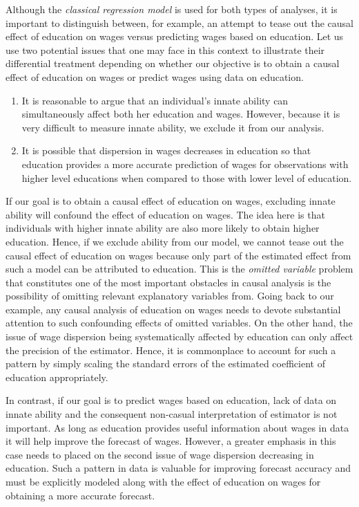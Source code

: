\documentclass[
]{book}
\theoremstyle{definition}
\theoremstyle{definition}
\theoremstyle{definition}
\theoremstyle{definition}
\theoremstyle{remark}
\begin{document}
Although the \emph{classical regression model} is used for both types of analyses, it is important to distinguish between, for example, an attempt to tease out the causal effect of education on wages versus predicting wages based on education. Let us use two potential issues that one may face in this context to illustrate their differential treatment depending on whether our objective is to obtain a causal effect of education on wages or predict wages using data on education.

\begin{enumerate}
\def\labelenumi{\alph{enumi}.}
\item
  It is reasonable to argue that an individual's innate ability can simultaneously affect both her education and wages. However, because it is very difficult to measure innate ability, we exclude it from our analysis.
\item
  It is possible that dispersion in wages decreases in education so that education provides a more accurate prediction of wages for observations with higher level educations when compared to those with lower level of education.
\end{enumerate}

If our goal is to obtain a causal effect of education on wages, excluding innate ability will confound the effect of education on wages. The idea here is that individuals with higher innate ability are also more likely to obtain higher education. Hence, if we exclude ability from our model, we cannot tease out the causal effect of education on wages because only part of the estimated effect from such a model can be attributed to education. This is the \emph{omitted variable} problem that constitutes one of the most important obstacles in causal analysis is the possibility of omitting relevant explanatory variables from. Going back to our example, any causal analysis of education on wages needs to devote substantial attention to such confounding effects of omitted variables. On the other hand, the issue of wage dispersion being systematically affected by education can only affect the precision of the estimator. Hence, it is commonplace to account for such a pattern by simply scaling the standard errors of the estimated coefficient of education appropriately.

In contrast, if our goal is to predict wages based on education, lack of data on innate ability and the consequent non-casual interpretation of estimator is not important. As long as education provides useful information about wages in data it will help improve the forecast of wages. However, a greater emphasis in this case needs to placed on the second issue of wage dispersion decreasing in education. Such a pattern in data is valuable for improving forecast accuracy and must be explicitly modeled along with the effect of education on wages for obtaining a more accurate forecast.
\end{document}
